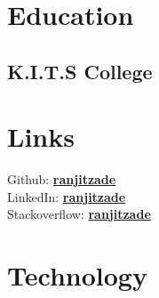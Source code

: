 \documentclass[]{deedy-resume-openfont}
\begin{document}
%
%

%
%

%
%

\begin{minipage}[t]{0.33\textwidth} 


\section{Education} 

\subsection{K.I.T.S College}
\sectionsep


\section{Links} 
Github: \href{https://github.com/ranjitzade}{\bf ranjitzade} \\
LinkedIn:  \href{https://www.linkedin.com/in/ranjitzade/}{\bf ranjitzade} \\
Stackoverflow:  \href{https://stackoverflow.com/users/3898498/ranjitzade}{\bf ranjitzade} \\


\section{Technology}

\end{minipage}
\end{document}
